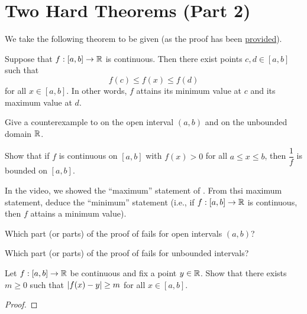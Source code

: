 \section{Two Hard Theorems (Part 2)}


\begin{callout}
  We take the following theorem to be given (as the proof has been \href{https://youtu.be/39ntUHbmXpc}{provided}).
  \begin{theorem}
  \label{thm:extreme-value-theorem}
    Suppose that $f : [a, b] \to \mathbb{R}$ is continuous. Then there exist points $c, d \in [a, b]$ such that
    \[
      f(c) \leq f(x) \leq f(d)
    \]
    for all $x \in [a, b]$. In other words, $f$ attains its minimum value at $c$ and its maximum value at $d$.
  \end{theorem}
\end{callout}

\begin{problem}
  Give a counterexample to  on the open
  interval $(a, b)$ and on the unbounded domain $\mathbb{R}$. 

\end{problem}

\begin{problem}
  Show that if $f$ is continuous on $[a,b]$ with $f(x) > 0$ for all $a \leq x \leq b$,
  then $\dfrac{1}{f}$ is bounded on $[a,b]$. 

\end{problem}

\begin{problem}
  In the video, we showed the ``maximum'' statement of . From thsi maximum statement, deduce the ``minimum'' statement
  (i.e., if $f : [a,b] \to \mathbb{R}$ is continuous, then $f$ attains a minimum value). 
\end{problem}

\begin{problem}
  Which part (or parts) of the proof of  fails for open intervals $(a, b)$?
\end{problem}

\begin{problem}
  Which part (or parts) of the proof of  fails for unbounded intervals? 
\end{problem}

\begin{problem}
  Let $f : [a, b] \to \mathbb{R}$ be continuous and fix a point $y \in \mathbb{R}$. Show that there exists $m \geq 0$ such that
  $\left\lvert f(x) - y \right\rvert \geq m$ for all $x \in [a, b]$.

  \begin{proof}
  \end{proof}
\end{problem}
